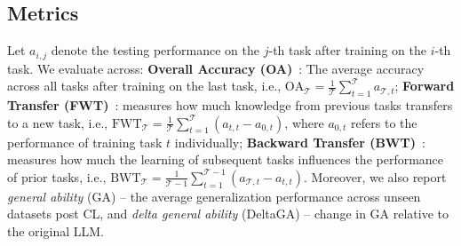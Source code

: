 \documentclass[11pt]{article}
\begin{document}
\subsection{Metrics}
Let $a_{i,j}$ denote the testing performance on the $j$-th task after training on the $i$-th task. We evaluate across:
\textbf{Overall Accuracy (OA)}~\cite{chaudhry2018riemannian}: The average accuracy across all tasks after training on the last task, i.e., $\text{OA}_\mathcal{T} = \frac{1}{\mathcal{T}} \sum_{t=1}^{\mathcal{T}} a_{\mathcal{T},t}$; \textbf{Forward Transfer (FWT)}~\cite{lopez2017gradient}: measures how much knowledge from previous tasks transfers to a new task, i.e., $\text{FWT}_\mathcal{T} = \frac{1}{\mathcal{T}} \sum_{t=1}^{\mathcal{T}} (a_{t,t} - a_{0,t})$, where $a_{0,t}$ refers to the performance of training task $t$ individually; \textbf{Backward Transfer (BWT)}~\cite{ke2022continual}: measures how much the learning of subsequent tasks influences the performance of prior tasks, i.e., $\text{BWT}_\mathcal{T} = \frac{1}{\mathcal{T} - 1} \sum_{t=1}^{\mathcal{T} - 1} (a_{\mathcal{T},t} - a_{t,t})$. Moreover, we also report \emph{general ability} (GA) -- the average generalization performance across unseen datasets post CL, 
and \emph{delta general ability} (DeltaGA) -- change in GA relative to the original LLM.
\end{document}
